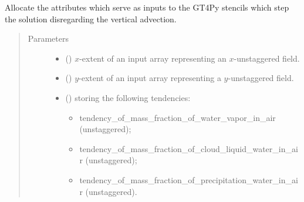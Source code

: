 \documentclass[letterpaper,10pt,english]{sphinxmanual}
\begin{document}
\begin{fulllineitems}
\begin{fulllineitems}
\begin{quote}
\begin{description}
\end{description}\end{quote}

\end{fulllineitems}


\begin{fulllineitems}
\label{\detokenize{api:tasmania.dycore.prognostic_isentropic.PrognosticIsentropic._stencils_stepping_by_neglecting_vertical_advection_allocate_inputs}}
Allocate the attributes which serve as inputs to the GT4Py stencils which step the solution
disregarding the vertical advection.
\begin{quote}\begin{description}
\item[{Parameters}] \leavevmode\begin{itemize}
\item {} 
 () \textendash{} \(x\)-extent of an input array representing an \(x\)-unstaggered field.

\item {} 
 () \textendash{} \(y\)-extent of an input array representing a \(y\)-unstaggered field.

\item {} 
 () \textendash{} 
{\hyperref[\detokenize{api:tasmania.storages.grid_data.GridData}]{}} storing the following tendencies:
\begin{itemize}
\item {} 
tendency\_of\_mass\_fraction\_of\_water\_vapor\_in\_air (unstaggered);

\item {} 
tendency\_of\_mass\_fraction\_of\_cloud\_liquid\_water\_in\_air (unstaggered);

\item {} 
tendency\_of\_mass\_fraction\_of\_precipitation\_water\_in\_air (unstaggered).

\end{itemize}



\end{itemize}
\end{description}
\end{quote}
\end{fulllineitems}
\end{fulllineitems}
\end{document}
